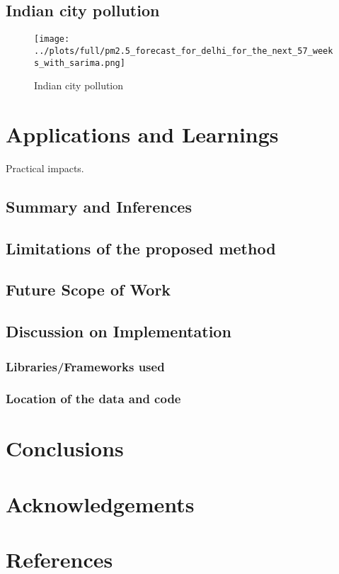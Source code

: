 \documentclass[manuscript,screen,nonacm,11pt]{acmart}
\numberwithin{equation}{section}
\begin{document}
\subsection{Indian city pollution}
\label{sec:indiancitypollution}
\begin{figure}[H]
	\centering
	\texttt{[image: ../plots/full/pm2.5\_forecast\_for\_delhi\_for\_the\_next\_57\_weeks\_with\_sarima.png]}
	\caption{Indian city pollution}
\label{fig:indiancitypollution}
\end{figure}



\section{Applications and Learnings}
\label{sec:appln}
Practical impacts.
\subsection{Summary and Inferences}
\subsection{Limitations of the proposed method}
\subsection{Future Scope of Work}
\subsection{Discussion on Implementation}
\subsubsection{Libraries/Frameworks used}
\subsubsection{Location of the data and code} 

\section{Conclusions}
\label{sec:concl}

\section*{Acknowledgements}

\section*{References}
\begin{thebibliography}{10}
\end{thebibliography}
\end{document}
